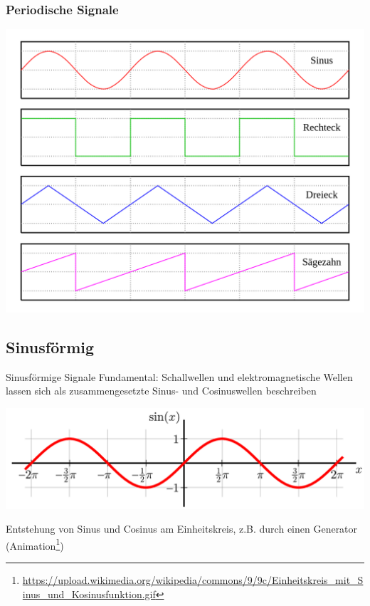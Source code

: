 \begin{frame}
    \frametitle{Periodische Signale}

    \begin{center}
        \includegraphics[width=\textwidth,height=0.9\textheight,keepaspectratio]{a11/Waveforms_de.png}
        \tiny \hyperlink{refs}{\cite{wc}}
    \end{center}

\end{frame}

\subsection{Sinusförmig}

\begin{frame}{Sinusförmige Signale}
  Fundamental: Schallwellen und elektromagnetische Wellen lassen sich als zusammengesetzte Sinus- und Cosinuswellen beschreiben

  \begin{center}
    \includegraphics[width=\textwidth,height=.4\textheight,keepaspectratio]{a11/Sine.pdf}
    {\tiny \hyperlink{refs}{\cite{wm}}}
  \end{center}

  Entstehung von Sinus und Cosinus am Einheitskreis, z.B. durch einen Generator (Animation\footnote{
  \url{https://upload.wikimedia.org/wikipedia/commons/9/9c/Einheitskreis_mit_Sinus_und_Kosinusfunktion.gif}})

\end{frame}

